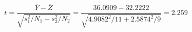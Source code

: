 

\[
t = \frac{\bar{Y} - \bar{Z}}{\sqrt{s_1^2/N_1 + s_2^2/N_2}} = \frac{36.0909 - 32.2222}{\sqrt{4.9082^2/11 + 2.5874^2/9}} = 2.259
\]


